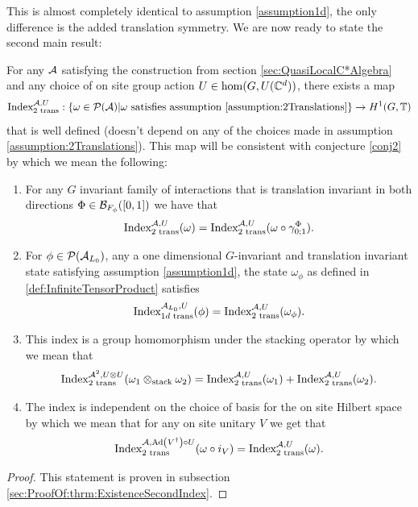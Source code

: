 \documentclass[12pt,a4paper,twoside]{article}
\numberwithin{equation}{section}
\begin{document}
This is almost completely identical to assumption \ref{assumption1d}, the only difference is the added translation symmetry. We are now ready to state the second main result:
\begin{theorem}\label{thrm:ExistenceSecondIndex}
	For any $\AA$ satisfying the construction from section \ref{sec:QuasiLocalC*Algebra} and any choice of on site group action $U\in\hom(G,U(\CC^d))$, there exists a map
	\begin{equation}
		\textrm{Index}^{\AA,U}_{2\text{ trans}}:\{\omega\in\PP(\AA)| \omega\text{ satisfies assumption \ref{assumption:2Translations}}\}\rightarrow H^1(G,\TT)
	\end{equation}
	that is well defined (doesn't depend on any of the choices made in assumption \ref{assumption:2Translations}). This map will be consistent with conjecture \ref{conj2} by which we mean the following:
	\begin{enumerate}
		\item For any $G$ invariant family of interactions that is translation invariant in both directions $\Phi\in\BB_{F_\phi}([0,1])$ we have that
		\begin{equation}
			\textrm{Index}^{\AA,U}_{2\text{ trans}}(\omega)=\textrm{Index}^{\AA,U}_{2\text{ trans}}(\omega\circ\gamma^\Phi_{0;1}).
		\end{equation}
		\item For $\phi\in\PP(\AA_{L_0})$, any a one dimensional $G$-invariant and translation invariant state satisfying assumption \ref{assumption1d}, the state $\omega_\phi$ as defined in \ref{def:InfiniteTensorProduct} satisfies
		\begin{equation}
			\textrm{Index}^{\AA_{L_0},U}_{1d\text{ trans}}(\phi)=\text{Index}^{\AA,U}_{2\text{ trans}}(\omega_\phi).
		\end{equation}
		\item This index is a group homomorphism under the stacking operator by which we mean that
		\begin{equation}
			\textrm{Index}_{\text{2 trans}}^{\AA^2,U\otimes U}(\omega_1\otimes_{\text{stack}}\omega_2)=\textrm{Index}_{\text{2 trans}}^{\AA,U}(\omega_1)+\textrm{Index}_{\text{2 trans}}^{\AA,U}(\omega_2).
		\end{equation}
		\item The index is independent on the choice of basis for the on site Hilbert space by which we mean that for any on site unitary $V$ we get that
		\begin{equation}
			\textrm{Index}^{\AA,\Ad{V^\dagger}\circ U}_{\text{2 trans}}(\omega\circ i_V) =\textrm{Index}^{\AA,U}_{\text{2 trans}}(\omega).
		\end{equation}
	\end{enumerate}
\end{theorem}
\begin{proof}
	This statement is proven in subsection \ref{sec:ProofOf:thrm:ExistenceSecondIndex}.
\end{proof}
\end{document}
